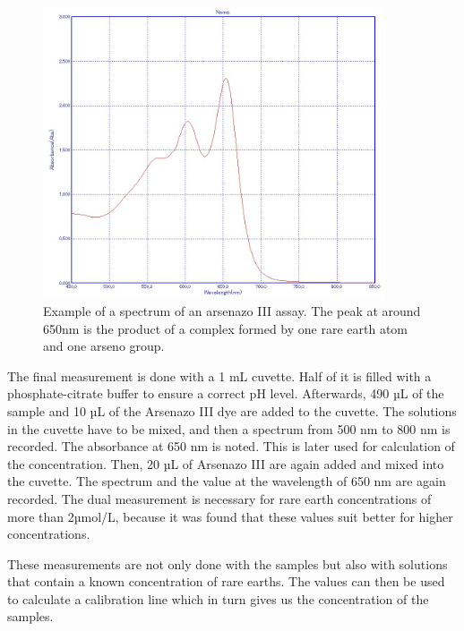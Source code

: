 \begin{figure}[H]
    \centering
    \includegraphics[width=0.9\textwidth]{./media/images/example_spectrum}
    \caption{Example of a spectrum of an arsenazo III assay. The peak at around 650nm is the product of a complex formed by one rare earth atom and one arseno group.}
    \label{fig:example_spectrum}
\end{figure}

The final measurement is done with a 1 mL cuvette.
Half of it is filled with a phosphate-citrate buffer to ensure a correct pH level.
Afterwards, 490 µL of the sample and 10 µL of the Arsenazo III dye are added to the cuvette.
The solutions in the cuvette have to be mixed, and then a spectrum from 500 nm to 800 nm is recorded.
The absorbance at 650 nm is noted.
This is later used for calculation of the concentration.
Then, 20 µL of Arsenazo III are again added and mixed into the cuvette.
The spectrum and the value at the wavelength of 650 nm are again recorded.
The dual measurement is necessary for rare earth concentrations of more than 2µmol/L, because it was found that these values suit better for higher concentrations.

These measurements are not only done with the samples but also with solutions that contain a known concentration of rare earths.
The values can then be used to calculate a calibration line which in turn gives us the concentration of the samples.